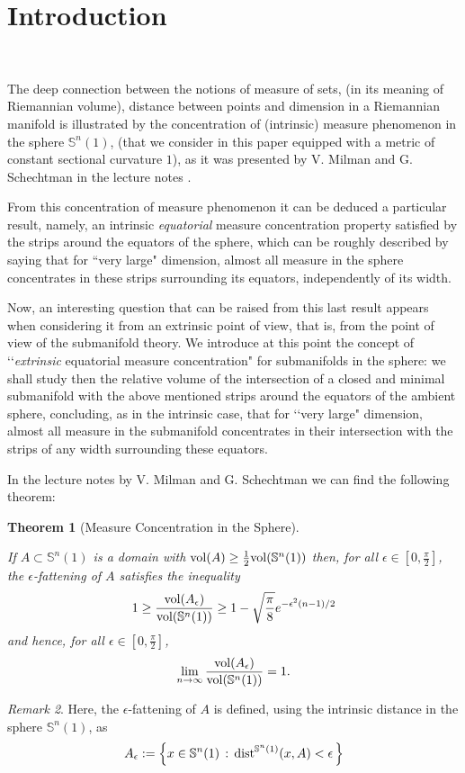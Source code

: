 \documentclass{amsart}
\newtheorem{theorem}{Theorem}[section]
\theoremstyle{definition}
\theoremstyle{remark}
\newtheorem{remark}[theorem]{Remark}
\newcommand{\ese}{\mathbb{S}}
\begin{document}
\section{Introduction}\label{sec:intro}\

The deep connection between the notions of measure of sets, (in its meaning of Riemannian volume), distance between points and dimension in a Riemannian manifold is illustrated by the concentration of (intrinsic) measure phenomenon in the sphere $\ese^n(1)$, (that we consider in this paper equipped with a metric of constant sectional curvature $1$), as it was presented  by V. Milman and G. Schechtman in the lecture notes \cite{MS}.

From this concentration of measure phenomenon it can be deduced a particular result, namely, an intrinsic {\em equatorial} measure concentration property satisfied by the strips around the equators of the sphere, which can be roughly described by saying that for ``very large" dimension, almost all measure in the sphere concentrates in these strips surrounding its equators, independently of its width. 

Now, an interesting question that can be raised from this last result appears when considering it from an extrinsic point of view, that is, from the point of view of the submanifold theory. 
We introduce at this point  the concept of \lq\lq {\em extrinsic} equatorial measure concentration"  for submanifolds in the sphere: we shall study then the relative volume of the intersection of a closed and minimal submanifold with the above mentioned strips around the equators of the ambient sphere, concluding, as in the intrinsic case, that for \lq\lq very large" dimension, almost all measure in the submanifold concentrates in their intersection with the strips of any width surrounding these equators. 
\newpage

In the lecture notes by V. Milman and G. Schechtman \cite{MS} we can find the following theorem:

\begin{theorem}[Measure Concentration in the Sphere]\label{measurecon}\

 If $A\subset \mathbb{S}^n(1)$ is a domain with ${\rm vol }(A)\geq \frac{1}{2} {\rm vol}(\mathbb{S}^n(1))$ then, for all $\epsilon \in [0,\frac{\pi}{2}]$, the  $\epsilon$-fattening of $A$ satisfies the inequality
\begin{equation}\label{eq1}
1 \geq \frac{{\rm vol}(A_\epsilon)}{{\rm vol}(\mathbb{S}^n(1))}\geq 1-\sqrt{\frac{\pi}{8}}e^{-\epsilon^2(n-1)/2}
\end{equation}
\noindent and hence, for all $\epsilon \in [0,\frac{\pi}{2}]$, 
\begin{equation}\label{eq2}
\lim_{n\to \infty} \frac{{\rm vol}(A_\epsilon)}{{\rm vol}(\mathbb{S}^n(1))}= 1.
\end{equation}
\end{theorem}  
\begin{remark}
Here, the $\epsilon$-fattening of $A$ is defined, using the intrinsic distance in the sphere $\ese^n(1)$, as
$$A_\epsilon:=\left\{x\in \mathbb{S}^n(1)\, :\, {\rm dist}^{\mathbb{S}^n(1)}(x,A)<\epsilon\, \right\}
$$
 \end{remark}
\end{document}
